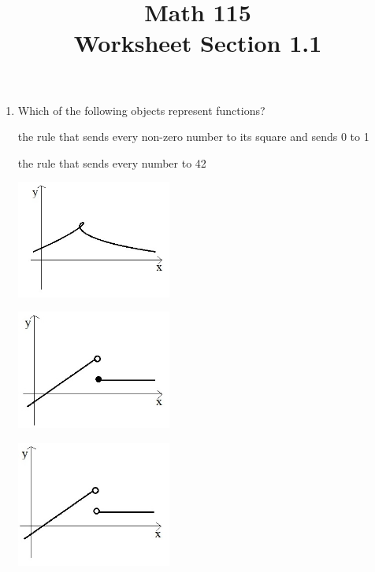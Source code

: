 \documentclass[11pt]{exam}
\title{\vspace{-0.5in} Math 115 \\ Worksheet Section 1.1}
\date{}
\theoremstyle{definition}
\begin{document}
\maketitle
\vspace{-0.75in}
\begin{questions}
 \question
  	\begin{enumerate}
	\item Which of the following objects represent functions?
	
	\hspace*{.2cm}the rule that sends every non-zero number to its square and sends 0 to 1
	
	\hspace*{.2cm}the rule that sends every number to 42
	
	\begin{multicols}{3}
	 
	
	\includegraphics[width=2in]{plot1.jpg}
	
	
	
	
	\includegraphics[width=2in]{plot2.jpg}
	
	
	
	
	\includegraphics[width=2in]{plot3.jpg}
	
	\end{multicols}
	

\end{enumerate}
\end{questions}
\end{document}
